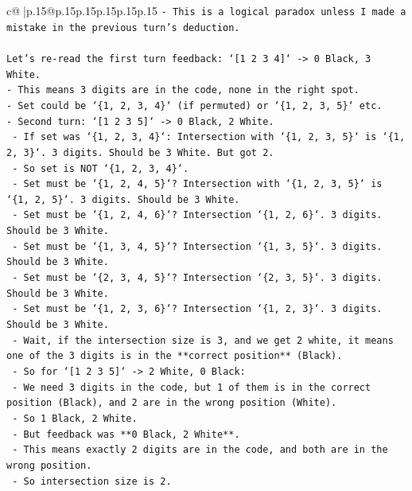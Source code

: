 \documentclass{article}
\begin{document}
{\begin{supertabular}{c@{$\;$}|p{.15\linewidth}@{}p{.15\linewidth}p{.15\linewidth}p{.15\linewidth}p{.15\linewidth}p{.15\linewidth}}
{{{\texttt{{-} This is a logical paradox unless I made a mistake in the previous turn's deduction.} \\
\\ 
\texttt{Let's re{-}read the first turn feedback: `{[}1 2 3 4{]}` {-}> 0 Black, 3 White.} \\
\texttt{{-} This means 3 digits are in the code, none in the right spot.} \\
\texttt{{-} Set could be `\{1, 2, 3, 4\}` (if permuted) or `\{1, 2, 3, 5\}` etc.} \\
\texttt{{-} Second turn: `{[}1 2 3 5{]}` {-}> 0 Black, 2 White.} \\
\texttt{    {-} If set was `\{1, 2, 3, 4\}`: Intersection with `\{1, 2, 3, 5\}` is `\{1, 2, 3\}`. 3 digits. Should be 3 White. But got 2.} \\
\texttt{    {-} So set is NOT `\{1, 2, 3, 4\}`.} \\
\texttt{    {-} Set must be `\{1, 2, 4, 5\}`? Intersection with `\{1, 2, 3, 5\}` is `\{1, 2, 5\}`. 3 digits. Should be 3 White.} \\
\texttt{    {-} Set must be `\{1, 2, 4, 6\}`? Intersection `\{1, 2, 6\}`. 3 digits. Should be 3 White.} \\
\texttt{    {-} Set must be `\{1, 3, 4, 5\}`? Intersection `\{1, 3, 5\}`. 3 digits. Should be 3 White.} \\
\texttt{    {-} Set must be `\{2, 3, 4, 5\}`? Intersection `\{2, 3, 5\}`. 3 digits. Should be 3 White.} \\
\texttt{    {-} Set must be `\{1, 2, 3, 6\}`? Intersection `\{1, 2, 3\}`. 3 digits. Should be 3 White.} \\
\texttt{    {-} Wait, if the intersection size is 3, and we get 2 white, it means one of the 3 digits is in the **correct position** (Black).} \\
\texttt{    {-} So for `{[}1 2 3 5{]}` {-}> 2 White, 0 Black:} \\
\texttt{        {-} We need 3 digits in the code, but 1 of them is in the correct position (Black), and 2 are in the wrong position (White).} \\
\texttt{        {-} So 1 Black, 2 White.} \\
\texttt{        {-} But feedback was **0 Black, 2 White**.} \\
\texttt{        {-} This means exactly 2 digits are in the code, and both are in the wrong position.} \\
\texttt{        {-} So intersection size is 2.} \\
}}}
\end{supertabular}}
\end{document}
